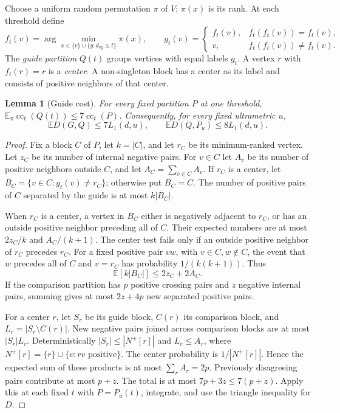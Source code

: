 \documentclass[11pt]{article}
\newtheorem{lemma}[theorem]{Lemma}
\theoremstyle{definition}
\newcommand{\E}{\mathbb E}
\begin{document}
Choose a uniform random permutation $\pi$ of $V$; $\pi(x)$ is its rank.
At each threshold define
\begin{equation}\label{eq:guide}
 f_t(v)=\arg\min_{x\in\{v\}\cup\{y:d_{vy}\le t\}}\pi(x),\qquad
 g_t(v)=
 \begin{cases}f_t(v),&f_t(f_t(v))=f_t(v),\\
 v,&f_t(f_t(v))\ne f_t(v).
 \end{cases}
\end{equation}
The \emph{guide partition} $Q(t)$ groups vertices with equal labels $g_t$.
A vertex $r$ with $f_t(r)=r$ is a \emph{center}. A non-singleton block has
a center as its label and consists of positive neighbors of that center.

\begin{lemma}[Guide cost]\label{lem:guide}
For every fixed partition $P$ at one threshold,
$\E_\pi\operatorname{cc}_t(Q(t))\le7\operatorname{cc}_t(P)$.
Consequently, for every fixed ultrametric $u$,
\[
 \E D(G,Q)\le7L_1(d,u),\qquad
 \E D(Q,P_u)\le8L_1(d,u).
\]
\end{lemma}
\begin{proof}
Fix a block $C$ of $P$, let $k=|C|$, and let $r_C$ be its minimum-ranked
vertex. Let $z_C$ be its number of internal negative pairs. For $v\in C$
let $A_v$ be its number of positive neighbors outside $C$, and let
$A_C=\sum_{v\in C}A_v$.
If $r_C$ is a center, let $B_C=\{v\in C:g_t(v)\ne r_C\}$; otherwise
put $B_C=C$. The number of positive pairs of $C$ separated by the guide is
at most $k|B_C|$.

When $r_C$ is a center, a vertex in $B_C$ either is negatively adjacent
to $r_C$, or has an outside positive neighbor preceding all of $C$.
Their expected numbers are at most $2z_C/k$ and $A_C/(k+1)$.
The center test fails only if an outside positive neighbor of $r_C$
precedes $r_C$. For a fixed positive pair $vw$, with $v\in C,w\notin C$,
the event that $w$ precedes all of $C$ and $v=r_C$ has probability
$1/(k(k+1))$. Thus
\[
 \E[k|B_C|]\le2z_C+2A_C.
\]
If the comparison partition has $p$ positive crossing pairs and $z$ negative
internal pairs, summing gives at most $2z+4p$ new separated positive pairs.

For a center $r$, let $S_r$ be its guide block, $C(r)$ its comparison
block, and $L_r=|S_r\setminus C(r)|$. New negative pairs joined across
comparison blocks are at most $|S_r|L_r$. Deterministically
$|S_r|\le|N^+[r]|$ and $L_r\le A_r$, where
$N^+[r]=\{r\}\cup\{v:rv\text{ positive}\}$. The center probability is
$1/|N^+[r]|$. Hence the expected sum of these products is at most
$\sum_rA_r=2p$. Previously disagreeing pairs contribute at most $p+z$.
The total is at most $7p+3z\le7(p+z)$.
Apply this at each fixed $t$ with $P=P_u(t)$, integrate, and use the
triangle inequality for $D$.
\end{proof}
\end{document}
